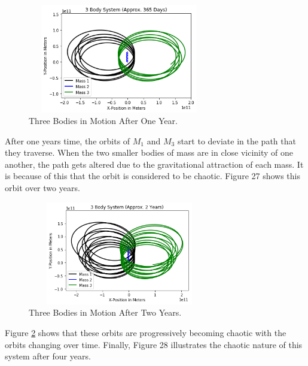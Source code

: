 \documentclass[twocolumn]{article}
\begin{document}
\begin{figure}[ht]
    \centering
    \includegraphics[width=8cm, height=4.75cm]{Figures/3-Body Dynamics (13).png}
    \caption{\small{Three Bodies in Motion After One Year.}}
    \label{Fig. 3-Body Dynamics Fig. 13}
\end{figure}
\par \noindent
After one years time, the orbits of $M_1$ and $M_3$ start to deviate in the path that they traverse. When the two smaller bodies of mass are in close vicinity of one another, the path gets altered due to the gravitational attraction of each mass. It is because of this that the orbit is considered to be chaotic. Figure 27 shows this orbit over two years.
\begin{figure}[ht]
    \centering
    \includegraphics[width=8cm, height=4.5cm]{Figures/3-Body Dynamics (14).png}
    \caption{\small{Three Bodies in Motion After Two Years.}}
    \label{Fig. 3-Body Dynamics Fig. 14}
\end{figure}
\newpage \noindent
Figure \ref{Fig. 3-Body Dynamics Fig. 14} shows that these orbits are progressively becoming chaotic with the orbits changing over time. Finally, Figure 28 illustrates the chaotic nature of this system after four years.
\end{document}
